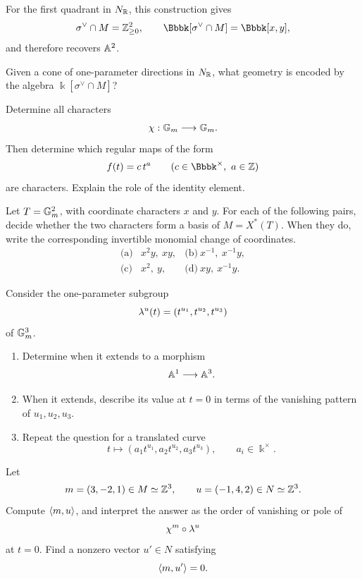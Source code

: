 For the first quadrant in \(N_{\mathbb{R}}\), this construction gives
\[
\sigma^\vee\cap M=\ZZ_{\geq0}^2,
\qquad
\Bbbk[\sigma^\vee\cap M]=\Bbbk[x,y],
\]
and therefore recovers \(\mathbb{A}^2\).

\begin{guidingquestion}
Given a cone of one-parameter directions in \(N_{\mathbb{R}}\), what geometry
is encoded by the algebra \(\Bbbk[\sigma^\vee\cap M]\)?
\end{guidingquestion}


\clearpage

\begin{exercises}

\item Determine all characters
\[
\chi:\mathbb{G}_{m}\longrightarrow\mathbb{G}_{m}.
\]
Then determine which regular maps of the form
\[
f(t)=c\,t^a
\qquad
(c\in\Bbbk^\times,\ a\in\ZZ)
\]
are characters. Explain the role of the identity element.

\item Let \(T=\mathbb{G}_{m}^2\), with coordinate characters \(x\) and \(y\).
For each of the following pairs, decide whether the two characters
form a basis of \(M=X^*(T)\). When they do, write the corresponding
invertible monomial change of coordinates.
\[
\begin{array}{lll}
\text{(a)}&x^2y,\ xy,&
\text{(b)}\ x^{-1},\ x^{-1}y,\\[1mm]
\text{(c)}&x^2,\ y,&
\text{(d)}\ xy,\ x^{-1}y.
\end{array}
\]

\item Consider the one-parameter subgroup
\[
\lambda^{u}(t)
=
(t^{u_1},t^{u_2},t^{u_3})
\]
of \(\mathbb{G}_{m}^3\).
\begin{enumerate}[label=(\alph*),wide=0pt]
\item Determine when it extends to a morphism
\[
\mathbb{A}^1\longrightarrow\mathbb{A}^3.
\]
\item When it extends, describe its value at \(t=0\) in terms of the
vanishing pattern of \(u_1,u_2,u_3\).
\item Repeat the question for a translated curve
\[
t\longmapsto(a_1t^{u_1},a_2t^{u_2},a_3t^{u_3}),
\qquad
a_i\in\Bbbk^\times.
\]
\end{enumerate}

\item Let
\[
m=(3,-2,1)\in M\simeq\mathbb{Z}^3,
\qquad
u=(-1,4,2)\in N\simeq\mathbb{Z}^3.
\]
Compute \(\left\langle m,u\right\rangle\), and interpret the answer as the order of
vanishing or pole of
\[
\chi^{m}\circ\lambda^{u}
\]
at \(t=0\). Find a nonzero vector \(u'\in N\) satisfying
\[
\left\langle m,u'\right\rangle=0.
\]


\end{exercises}

